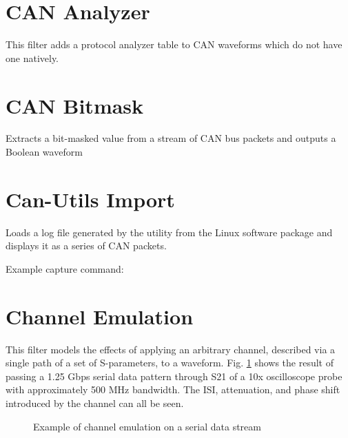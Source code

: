 \section{CAN Analyzer}
\label{filter:cananalyzer}

This filter adds a protocol analyzer table to CAN waveforms which do not have one natively.

\pagebreak
\section{CAN Bitmask}
\label{filter:canbitmask}

Extracts a bit-masked value from a stream of CAN bus packets and outputs a Boolean waveform

\pagebreak
\section{Can-Utils Import}

Loads a log file generated by the  utility from the Linux  software package and
displays it as a series of CAN packets.

Example capture command: 

\pagebreak
\section{Channel Emulation}
\label{filter:channelemu}

This filter models the effects of applying an arbitrary channel, described via a single path of a set of S-parameters,
to a waveform. Fig. \ref{filter_channelemu} shows the result of passing a 1.25 Gbps serial data pattern through S21 of
a 10x oscilloscope probe with approximately 500 MHz bandwidth. The ISI, attenuation, and phase shift introduced by the
channel can all be seen.

\begin{figure}[h]
\centering
{}
\caption{Example of channel emulation on a serial data stream}
\label{filter_channelemu}
\end{figure}

